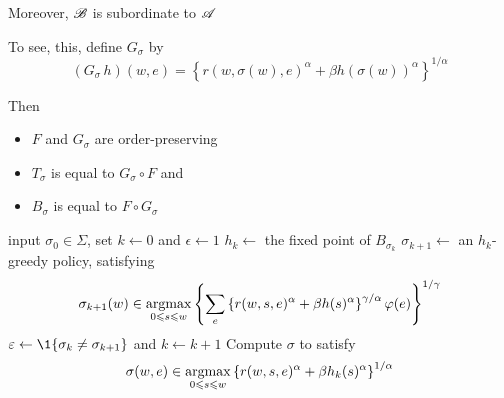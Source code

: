 \documentclass[dvipsnames]{beamer}
\begin{document}
\begin{frame}
    

    Moreover, $\bB$ is subordinate to $\aA$

            \vspace{0.5em}
            \vspace{0.5em}
            \vspace{0.5em}
    To see, this, define $G_\sigma$  by
    \begin{equation*}
        (G_\sigma \, h)(w, e) 
        = 
            \left\{
                r(w, \sigma(w), e)^\alpha + \beta 
                h(\sigma(w))^\alpha
            \right\}^{1/\alpha} 
    \end{equation*}

    Then 
    \begin{itemize}
        \item $F$ and $G_\sigma$ are order-preserving
            \vspace{0.5em}
        \item $T_\sigma$ is equal to $G_\sigma \circ F$ and 
            \vspace{0.5em}
        \item $B_\sigma$  is equal to $F \circ G_\sigma$ 
    \end{itemize}

\end{frame}


\begin{frame}
    

    \begin{algorithm}[H]
    \DontPrintSemicolon
    input $\sigma_0 \in \Sigma$, set $k \leftarrow 0$ and $\epsilon \leftarrow 1$ \;
    {
        $h_k \leftarrow $ the fixed point of $B_{\sigma_k}$ \;
        $\sigma_{k+1} \leftarrow $ an $h_k$-greedy policy, satisfying
        \begin{equation*}
            \sigma_{k+1}(w) \in \argmax_{0 \leq s \leq w}
            \left\{
                \sum_e
                \left\{ 
                    r(w, s, e)^\alpha + \beta h(s)^\alpha
                \right\}^{\gamma/\alpha}
                 \phi(e)
            \right\}^{1/\gamma}
        \end{equation*}
        \;
        \vspace{-1em}
        $\epsilon \leftarrow \1\{ \sigma_k \not= \sigma_{k+1} \}$ and $k \leftarrow k + 1$ \;
    }
    Compute $\sigma$ to satisfy
    $$
        \sigma(w, e) \in
        \argmax_{0 \leq s \leq w}
        \left\{
            r(w, s, e)^\alpha + \beta 
            h_k(s)^{\alpha}
        \right\}^{1/\alpha} 
    $$ \;
    \vspace{-2em}
    \Return{$\sigma$}
    \caption{Solving $\aA$ via $\bB$}
\end{algorithm}

\end{frame}
\end{document}
